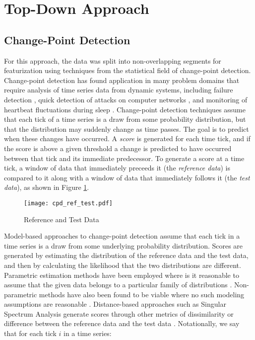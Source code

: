 
\section{Top-Down Approach}
\label{sec:topdown}

\subsection{Change-Point Detection}
For this approach, the data was split into non-overlapping segments for
featurization using techniques from the statistical field of change-point
detection. Change-point detection has found application in many problem domains
that require analysis of time series data from dynamic systems, including
failure detection \cite{bae13}, quick detection of attacks on computer networks
\cite{tartakovsky06}, and monitoring of heartbeat fluctuations during
sleep \cite{staudacher05}. Change-point detection techniques assume that each
tick of a time series is a draw from some probability
distribution, but that the distribution may suddenly change as time passes.
The goal is to predict when these changes have occurred.
A \emph{score} is generated for each time tick, and if the score is
above a given threshold a change is predicted to have occurred between that tick
and its immediate predecessor. To generate a score at a time tick, a window of
data that immediately preceeds it (the \emph{reference data}) is compared to it
along with a window of data that immediately follows it (the \emph{test data}), 
as shown in Figure \ref{fig:cpd_ref_test}.

\begin{figure}
 \centering
 \texttt{[image: cpd\_ref\_test.pdf]}
 \caption{Reference and Test Data}
 \label{fig:cpd_ref_test}
\end{figure}

Model-based approaches to change-point detection assume that each tick in
a time series is a draw from some underlying probability distribution.
Scores are generated by estimating the distribution of the reference data
and the test data, and then by calculating the likelihood
that the two distributions are different. Parametric estimation methods have
been employed where is it reasonable to assume that the given data belongs to a
particular family of distributions \cite{thatte11}. Non-parametric methods have
also been found to be viable where no such modeling
assumptions are reasonable \cite{matteson12}. Distance-based approaches such as
Singular Spectrum Analysis generate scores through other metrics of 
dissimilarity or difference between the reference data and the test data
\cite{moskvina03}.
Notationally, we say that for each tick $i$ in a time series:


